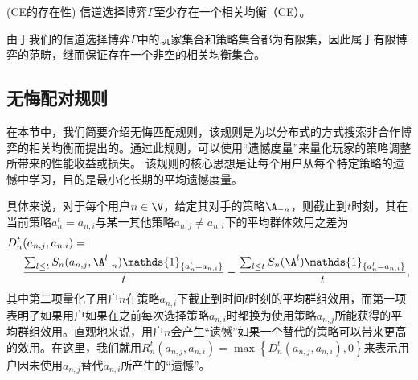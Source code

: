 \begin{thm}(CE的存在性)
信道选择博弈$\Gamma$至少存在一个相关均衡（CE）。
\end{thm}
由于我们的信道选择博弈$\Gamma$中的玩家集合和策略集合都为有限集，因此属于有限博弈的范畴，继而保证存在一个非空的相关均衡集合\cite{Lasaulce2011}。


\subsection{无悔配对规则}\label{sec:noregret}
在本节中，我们简要介绍无悔匹配规则，该规则是为以分布式的方式搜索非合作博弈的相关均衡而提出的\cite{Hart00asimple}。通过此规则，可以使用“遗憾度量”来量化玩家的策略调整所带来的性能收益或损失。
该规则的核心思想是让每个用户从每个特定策略的遗憾中学习，目的是最小化长期的平均遗憾度量。

具体来说，对于每个用户$n\in\V$，给定其对手的策略$\A_{-n}$，则截止到$t$时刻，其在当前策略$a^t_n=a_{n,i}$与某一其他策略$a_{n,j}\neq a_{n,i}$下的平均群体效用之差为
\begin{align}\label{eq:reg1}
\small
D_n^t&(a_{n,j},a_{n,i})=\nonumber\\
&\frac{\sum_{l\leq t}S_n(a_{n,j},\A^l_{-n})\mathds{1}_{\{a^l_n=a_{n,i}\}}}{t}-\frac{\sum_{l\leq t}S_n(\A^l)\mathds{1}_{\{a^l_n=a_{n,i}\}}}{t},
\end{align}
其中第二项量化了用户$n$在策略$a_{n,i}$下截止到时间$t$时刻的平均群组效用，而第一项表明了如果用户如果在之前每次选择策略$a_{n,i}$时都换为使用策略$a_{n,j}$所能获得的平均群组效用。直观地来说，用户$n$会产生“遗憾”如果一个替代的策略可以带来更高的效用。在这里，我们就用$R^t_n(a_{n,j},a_{n,i})=\max\left\{D^t_n(a_{n,j},a_{n,i}),0\right\}$来表示用户因未使用$a_{n,j}$替代$a_{n,i}$所产生的“遗憾”。

